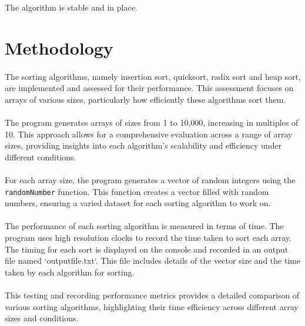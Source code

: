 \documentclass{article}
\begin{document}
The algorithm is stable and in place.

\section{Methodology}

\paragraph{}
The sorting algorithms, namely insertion sort, quicksort, radix sort and heap sort, are implemented and assessed for their performance. This assessment focuses on arrays of various sizes, particularly how efficiently these algorithms sort them.

\paragraph{}
The program generates arrays of sizes from 1 to 10,000, increasing in multiples of 10. This approach allows for a comprehensive evaluation across a range of array sizes, providing insights into each algorithm's scalability and efficiency under different conditions.

\paragraph{}
For each array size, the program generates a vector of random integers using the \texttt{randomNumber} function. This function creates a vector filled with random numbers, ensuring a varied dataset for each sorting algorithm to work on.

\paragraph{}
The performance of each sorting algorithm is measured in terms of time. The program uses high resolution clocks to record the time taken to sort each array. The timing for each sort is displayed on the console and recorded in an output file named `outputfile.txt`. This file includes details of the vector size and the time taken by each algorithm for sorting.

\paragraph{}
This testing and recording performance metrics provides a detailed comparison of various sorting algorithms, highlighting their time efficiency across different array sizes and conditions.
\end{document}
